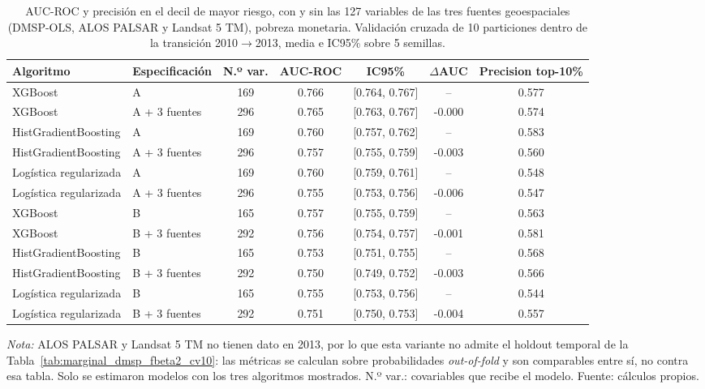 \begin{table}[H]
  \centering
  \caption{AUC-ROC y precisión en el decil de mayor riesgo, con y sin las
  127 variables de las tres fuentes geoespaciales (DMSP-OLS, ALOS PALSAR
  y Landsat 5 TM), pobreza monetaria. Validación cruzada de 10
  particiones dentro de la transición 2010$\to$2013, media e IC95\%
  sobre 5 semillas.}
  \label{tab:geo3_cv}
  \footnotesize
  \setlength{\tabcolsep}{4pt}
  \begin{tabular}{llccccc}
    \toprule
    \textbf{Algoritmo} & \textbf{Especificación} & \textbf{N.º var.} & \textbf{AUC-ROC} & \textbf{IC95\%} & \textbf{$\Delta$AUC} & \textbf{Precision top-10\%} \\
    \midrule
    XGBoost                  & A              & 169 & 0.766 & [0.764, 0.767] & -- & 0.577 \\
    XGBoost                  & A + 3 fuentes  & 296 & 0.765 & [0.763, 0.767] & -0.000 & 0.574 \\
    \addlinespace
    HistGradientBoosting     & A              & 169 & 0.760 & [0.757, 0.762] & -- & 0.583 \\
    HistGradientBoosting     & A + 3 fuentes  & 296 & 0.757 & [0.755, 0.759] & -0.003 & 0.560 \\
    \addlinespace
    Logística regularizada   & A              & 169 & 0.760 & [0.759, 0.761] & -- & 0.548 \\
    Logística regularizada   & A + 3 fuentes  & 296 & 0.755 & [0.753, 0.756] & -0.006 & 0.547 \\
    \addlinespace
    XGBoost                  & B              & 165 & 0.757 & [0.755, 0.759] & -- & 0.563 \\
    XGBoost                  & B + 3 fuentes  & 292 & 0.756 & [0.754, 0.757] & -0.001 & 0.581 \\
    \addlinespace
    HistGradientBoosting     & B              & 165 & 0.753 & [0.751, 0.755] & -- & 0.568 \\
    HistGradientBoosting     & B + 3 fuentes  & 292 & 0.750 & [0.749, 0.752] & -0.003 & 0.566 \\
    \addlinespace
    Logística regularizada   & B              & 165 & 0.755 & [0.753, 0.756] & -- & 0.544 \\
    Logística regularizada   & B + 3 fuentes  & 292 & 0.751 & [0.750, 0.753] & -0.004 & 0.557 \\
    \bottomrule
  \end{tabular}
  \begin{minipage}{0.95\textwidth}
    \vspace{4pt}
    \footnotesize \textit{Nota:} ALOS PALSAR y Landsat 5 TM no tienen
    dato en 2013, por lo que esta variante no admite el holdout temporal
    de la Tabla~\ref{tab:marginal_dmsp_fbeta2_cv10}: las métricas se calculan sobre
    probabilidades \emph{out-of-fold} y son comparables entre sí, no contra
    esa tabla. Solo se estimaron modelos con los tres algoritmos mostrados.
    N.º var.: covariables que recibe el modelo. Fuente: cálculos propios.
  \end{minipage}
\end{table}

